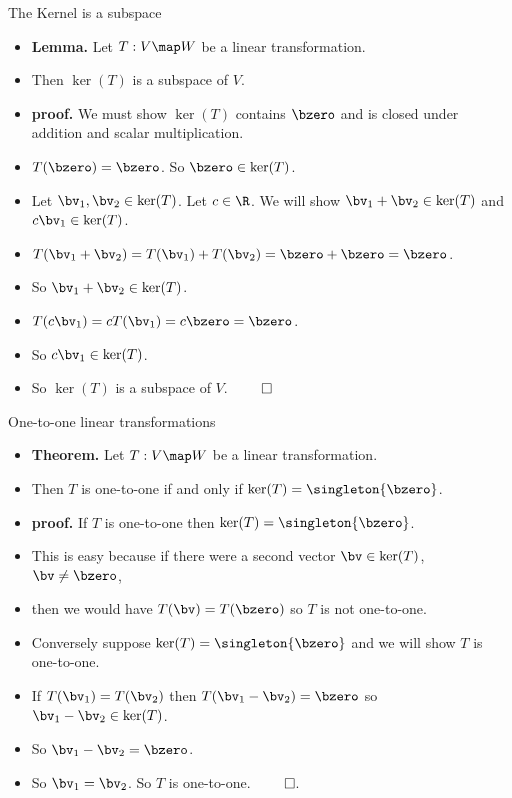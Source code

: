 \documentclass{beamer}
\begin{document}

\begin{frame}{The Kernel is a subspace}

\begin{itemize}
\item \textbf{Lemma.} Let $T:V\map W$ be a linear transformation.
\item Then $\ker(T)$ is a subspace of $V$.
\item \textbf{proof.} We must show $\ker(T)$ contains $\bzero$ and is closed
under addition and scalar multiplication.
\item $T(\bzero) = \bzero$. So $\bzero\in\ker(T)$.
\item Let $\bv_1,\bv_2\in\ker(T)$. Let $c\in\R$. We will show $\bv_1+\bv_2\in\ker(T)$ and $c\bv_1\in\ker(T)$.
\item $T(\bv_1+\bv_2)=T(\bv_1) + T(\bv_2) = \bzero + \bzero = \bzero$.
\item So $\bv_1+\bv_2\in\ker(T)$.
\item $T(c\bv_1)=cT(\bv_1)=c\bzero=\bzero$.
\item So $c\bv_1\in\ker(T)$.
\item So $\ker(T)$ is a subspace of $V$. $\qed$
\end{itemize}

\end{frame}


\begin{frame}{One-to-one linear transformations}

\begin{itemize}
\item \textbf{Theorem.} Let $T:V\map W$ be a linear transformation.
\item Then $T$ is one-to-one if and only if $\ker(T) = \singleton{\bzero}$.
\item \textbf{proof.} If $T$ is one-to-one then $\ker(T) = \singleton{\bzero}$.
\item This is easy because if there were a second vector $\bv\in\ker(T)$, $\bv\not=\bzero$,
\item then we would have $T(\bv) = T(\bzero)$ so $T$ is not one-to-one.
\item Conversely suppose $\ker(T) = \singleton{\bzero}$ and we will show $T$ is one-to-one.
\item If $T(\bv_1) = T(\bv_2)$ then $T(\bv_1  - \bv_2) = \bzero$ so $\bv_1 - \bv_2\in\ker(T)$.
\item So $\bv_1 - \bv_2 = \bzero$.
\item So $\bv_1 = \bv_2$. So $T$ is one-to-one. $\qed$.
\end{itemize}
\end{frame}
\end{document}

